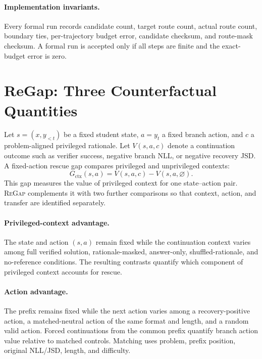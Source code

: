 \documentclass[letterpaper]{article}
\newcommand{\ReGap}{\textsc{ReGap}}
\begin{document}
\paragraph{Implementation invariants.}
Every formal run records candidate count, target route count, actual route
count, boundary ties, per-trajectory budget error, candidate checksum, and
route-mask checksum. A formal run is accepted only if all steps are finite and
the exact-budget error is zero.

\section{ReGap: Three Counterfactual Quantities}
\label{sec:regap}

Let $s=(x,y_{<t})$ be a fixed student state, $a=y_t$ a fixed branch action,
and $c$ a problem-aligned privileged rationale. Let $V(s,a,c)$ denote a
continuation outcome such as verifier success, negative branch NLL, or negative
recovery JSD. A fixed-action rescue gap compares privileged and unprivileged
contexts:
\begin{equation}
G_{\mathrm{ctx}}(s,a)=V(s,a,c)-V(s,a,\varnothing).
\label{eq:regap}
\end{equation}
This gap measures the value of privileged context for one state--action pair.
\ReGap{} complements it with two further comparisons so that context, action,
and transfer are identified separately.

\paragraph{Privileged-context advantage.}
The state and action $(s,a)$ remain fixed while the continuation context varies
among full verified solution, rationale-masked, answer-only, shuffled-rationale,
and no-reference conditions. The resulting contrasts quantify which component
of privileged context accounts for rescue.

\paragraph{Action advantage.}
The prefix remains fixed while the next action varies among a recovery-positive
action, a matched-neutral action of the same format and length, and a random
valid action. Forced continuations from the common prefix quantify branch
action value relative to matched controls. Matching uses problem, prefix
position, original NLL/JSD, length, and difficulty.
\end{document}
